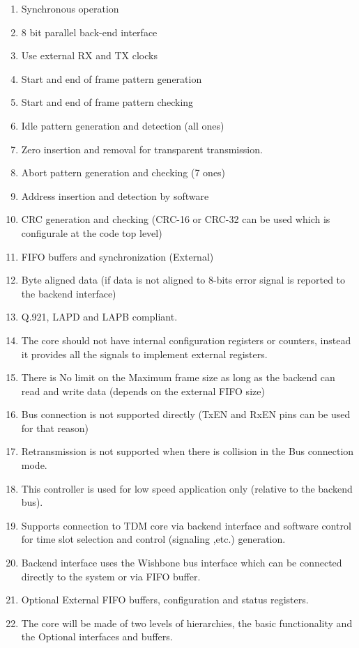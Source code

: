 \documentclass[a4paper,11pt]{article}
\begin{document}
\begin{enumerate}
\item  Synchronous operation
\item  8 bit parallel back-end interface
\item  Use external RX and TX clocks
\item  Start and end of frame pattern generation
\item  Start and end of frame pattern checking
\item  Idle pattern generation and detection (all ones)
\item  Zero insertion and removal for transparent transmission.
\item  Abort pattern generation and checking (7 ones)
\item  Address insertion and detection by software
\item  CRC generation and checking (CRC-16 or CRC-32 can be used which is configurale at the code top level)
\item  FIFO buffers and synchronization (External)
\item  Byte aligned data (if data is not aligned to 8-bits error signal is reported to the backend interface)
\item  Q.921, LAPD and LAPB compliant.
\item  The core should not have internal configuration registers or counters, instead it provides all the signals to implement external registers.
\item  There is No limit on the Maximum frame size as long as the backend can read and write data (depends on the external FIFO size)
\item  Bus connection is not supported directly (TxEN and RxEN pins can be used for that reason)
\item  Retransmission is not supported when there is collision in the Bus connection mode.
\item This controller is used for low speed application only (relative to the backend bus).
\item Supports connection to TDM core via backend interface and software control for time slot selection and control (signaling ,etc.) generation.
\item Backend interface uses the Wishbone bus interface which can be connected directly to the system or via FIFO buffer.
\item Optional External FIFO buffers, configuration and status registers.
\item The core will be made of two levels of hierarchies, the basic functionality and the Optional interfaces and buffers.
\end{enumerate}
 
\end{document}
